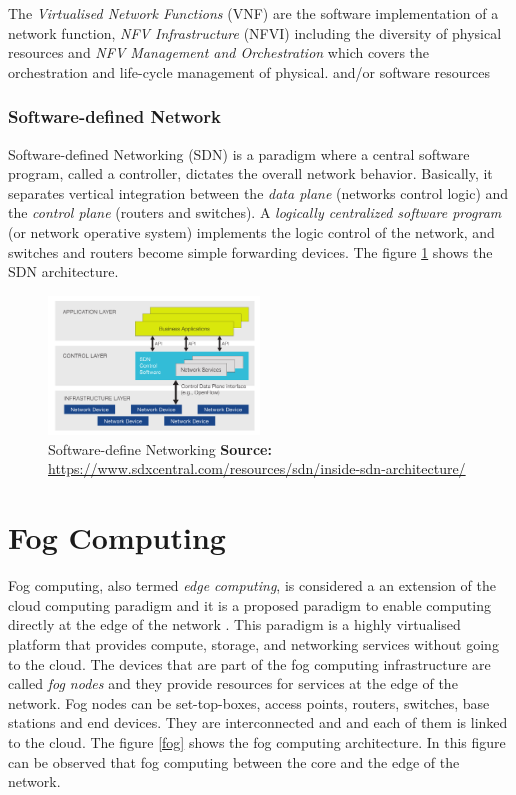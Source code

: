 The \emph{Virtualised Network Functions} (VNF) are the software implementation of a network function, \emph{NFV Infrastructure} (NFVI) including the diversity of physical resources and \emph{NFV Management and Orchestration} which covers the orchestration and life-cycle management of physical.
and/or software resources 

\subsubsection{Software-defined Network} 
Software-defined Networking (SDN) is a paradigm where a central software program, called a controller, dictates the overall network behavior\cite{sdn}. Basically, it separates vertical integration between the \emph{data plane} (networks control logic) and the \emph{control plane} (routers and switches). A \emph{logically centralized software program}   (or network operative system) implements the logic control of the network, and switches and routers become  simple forwarding devices. The figure \ref{sdn} shows the SDN architecture.

\begin{figure}[!h]
\centering
\includegraphics[width=0.5\textwidth]{images/sdn_architecture}
\caption[Software-define Networking]{Software-define Networking
\textbf{Source:} \url{https://www.sdxcentral.com/resources/sdn/inside-sdn-architecture/}}
\label{sdn}
\end{figure}

\section{Fog Computing}
Fog computing, also termed \emph{edge computing}, is considered a an extension of the cloud computing paradigm and it is a proposed paradigm to enable computing directly at the edge of the network \cite{fog}. This paradigm is a highly virtualised platform that provides compute, storage, and networking services without going to the cloud. The devices that are part of the fog computing infrastructure are called \emph{fog nodes} and they provide resources for services at the edge of the network. Fog nodes can be set-top-boxes, access points, routers, switches, base stations and end devices. They are interconnected and and each of them
is linked to the cloud. The figure \ref{fog} shows the fog computing architecture. In this figure can be observed that fog computing between the core and the edge of the network.

